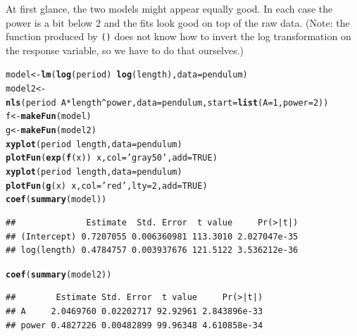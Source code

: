 \documentclass[twoside]{book}\usepackage[]{graphicx}\usepackage[]{xcolor}
\makeatletter
\newcommand{\hlnum}[1]{\textcolor[rgb]{0.686,0.059,0.569}{#1}}%
\newcommand{\hlstr}[1]{\textcolor[rgb]{0.192,0.494,0.8}{#1}}%
\newcommand{\hlopt}[1]{\textcolor[rgb]{0,0,0}{#1}}%
\newcommand{\hlstd}[1]{\textcolor[rgb]{0.345,0.345,0.345}{#1}}%
\newcommand{\hlkwb}[1]{\textcolor[rgb]{0.69,0.353,0.396}{#1}}%
\newcommand{\hlkwc}[1]{\textcolor[rgb]{0.333,0.667,0.333}{#1}}%
\newcommand{\hlkwd}[1]{\textcolor[rgb]{0.737,0.353,0.396}{\textbf{#1}}}%
\newenvironment{kframe}{%
 \def\at@end@of@kframe{}%
 \ifinner\ifhmode%
  \def\at@end@of@kframe{\end{minipage}}%
  \begin{minipage}{\columnwidth}%
 \fi\fi%
 \def\FrameCommand##1{\hskip\@totalleftmargin \hskip-\fboxsep
 \colorbox{shadecolor}{##1}\hskip-\fboxsep
     \hskip-\linewidth \hskip-\@totalleftmargin \hskip\columnwidth}%
 \MakeFramed {\advance\hsize-\width
   \@totalleftmargin\z@ \linewidth\hsize
   \@setminipage}}%
 {\par\unskip\endMakeFramed%
 \at@end@of@kframe}
\newenvironment{knitrout}{}{} %
\newcommand{\Rindex}[1]{\index{\texttt{#1}}}
\newcommand{\function}[1]{{\color{purple!75!blue}\texttt{\StrSubstitute{#1}{()}{}()}}\Rindex{#1}}
\makeatother
\begin{document}
\begin{solution}
	At first glance, the two models might appear equally good.  In each case the 
	power is a bit below 2 and the fits look good on top of the raw data.  (Note: the 
	function produced by \function{makeFun()} does not know how to invert the log
	transformation on the response variable, so we have to do that ourselves.)
\begin{knitrout}
\color{fgcolor}\begin{kframe}
\begin{alltt}
\hlstd{model} \hlkwb{<-} \hlkwd{lm}\hlstd{(} \hlkwd{log}\hlstd{(period)} \hlopt{~} \hlkwd{log}\hlstd{(length),} \hlkwc{data}\hlstd{=pendulum )}
\hlstd{model2} \hlkwb{<-} \hlkwd{nls}\hlstd{( period} \hlopt{~} \hlstd{A} \hlopt{*} \hlstd{length}\hlopt{^}\hlstd{power,} \hlkwc{data}\hlstd{=pendulum,} \hlkwc{start}\hlstd{=}\hlkwd{list}\hlstd{(}\hlkwc{A}\hlstd{=}\hlnum{1}\hlstd{,} \hlkwc{power}\hlstd{=}\hlnum{2}\hlstd{) )}
\hlstd{f} \hlkwb{<-} \hlkwd{makeFun}\hlstd{(model)}
\hlstd{g} \hlkwb{<-} \hlkwd{makeFun}\hlstd{(model2)}
\hlkwd{xyplot}\hlstd{(period} \hlopt{~} \hlstd{length,} \hlkwc{data}\hlstd{=pendulum)}
\hlkwd{plotFun}\hlstd{(}\hlkwd{exp}\hlstd{(}\hlkwd{f}\hlstd{(x))} \hlopt{~} \hlstd{x,} \hlkwc{col}\hlstd{=}\hlstr{'gray50'}\hlstd{,}\hlkwc{add}\hlstd{=}\hlnum{TRUE}\hlstd{)}
\hlkwd{xyplot}\hlstd{(period} \hlopt{~} \hlstd{length,} \hlkwc{data}\hlstd{=pendulum)}
\hlkwd{plotFun}\hlstd{(}\hlkwd{g}\hlstd{(x)} \hlopt{~} \hlstd{x,} \hlkwc{col}\hlstd{=}\hlstr{'red'}\hlstd{,} \hlkwc{lty}\hlstd{=}\hlnum{2}\hlstd{,} \hlkwc{add}\hlstd{=}\hlnum{TRUE}\hlstd{)}
\hlkwd{coef}\hlstd{(}\hlkwd{summary}\hlstd{(model))}
\end{alltt}
\begin{verbatim}
##              Estimate  Std. Error  t value     Pr(>|t|)
## (Intercept) 0.7207055 0.006360981 113.3010 2.027047e-35
## log(length) 0.4784757 0.003937676 121.5122 3.536212e-36
\end{verbatim}
\begin{alltt}
\hlkwd{coef}\hlstd{(}\hlkwd{summary}\hlstd{(model2))}
\end{alltt}
\begin{verbatim}
##        Estimate Std. Error  t value     Pr(>|t|)
## A     2.0469760 0.02202717 92.92961 2.843896e-33
## power 0.4827226 0.00482899 99.96348 4.610858e-34
\end{verbatim}
\end{kframe}


\end{knitrout}
\end{solution}
\end{document}

